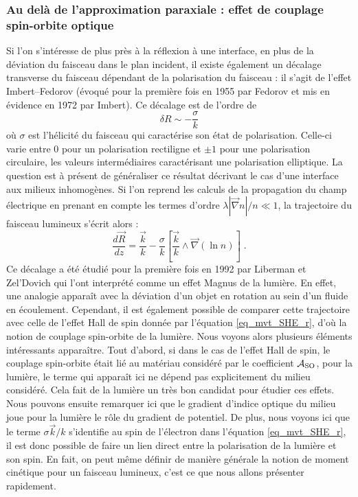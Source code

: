 \documentclass[a4paper,11pt]{article} %
\begin{document}
	\subsubsection{Au delà de l'approximation paraxiale : effet de couplage spin-orbite optique}
	
	Si l'on s'intéresse de plus près à la réflexion à une interface, en plus de la déviation du faisceau dans le plan incident, il existe également un décalage transverse du faisceau dépendant de la polarisation du faisceau : il s'agit de l'effet Imbert--Fedorov (évoqué pour la première fois en 1955 par Fedorov et mis en évidence en 1972 par Imbert). Ce décalage est de l'ordre de
	\begin{equation*}
		\delta R \sim - \frac{\sigma}{k}
	\end{equation*}
	où $ \sigma $ est l'hélicité du faisceau qui caractérise son état de polarisation. Celle-ci varie entre 0 pour un polarisation rectiligne et $\pm 1 $ pour une polarisation circulaire, les valeurs intermédiaires caractérisant une polarisation elliptique. La question est à présent de généraliser ce résultat décrivant le cas d'une interface aux milieux inhomogènes. Si l'on reprend les calculs de la propagation du champ électrique en prenant en compte les termes d'ordre $ \lambda | \vec{\nabla}n | / n \ll 1$, la trajectoire du faisceau lumineux s'écrit alors :
	\begin{equation}
		\frac{d \vec{R}}{dz} = \frac{\vec{k}}{k} - \frac{\sigma}{k} \left[ \frac{\vec{k}}{k} \wedge \vec{\nabla}(\ln n) \right] \; .
	\end{equation}
	Ce décalage a été étudié pour la première fois en 1992 par Liberman et Zel'Dovich qui l'ont interprété comme un effet Magnus de la lumière. En effet, une analogie apparaît avec la déviation d'un objet en rotation au sein d'un fluide en écoulement. Cependant, il est également possible de comparer cette trajectoire avec celle de l'effet Hall de spin donnée par l'équation \eqref{eq_mvt_SHE_r}, d'où la notion de couplage spin-orbite de la lumière. Nous voyons alors plusieurs éléments intéressants apparaître. Tout d'abord, si dans le cas de l'effet Hall de spin, le couplage spin-orbite était lié au matériau considéré par le coefficient $ \mathcal{A}_\textup{SO} $, pour la lumière, le terme qui apparaît ici ne dépend pas explicitement du milieu considéré. Cela fait de la lumière un très bon candidat pour étudier ces effets. Nous pouvons ensuite remarquer ici que le gradient d'indice optique du milieu joue pour la lumière le rôle du gradient de potentiel. De plus, nous voyons ici que le terme $ \sigma \vec{k} /k $ s'identifie au spin de l'électron dans l'équation \eqref{eq_mvt_SHE_r}, il est donc possible de faire un lien direct entre la polarisation de la lumière et son spin. En fait, on peut même définir de manière générale la notion de moment cinétique pour un faisceau lumineux, c'est ce que nous allons présenter rapidement.
	
\end{document}

